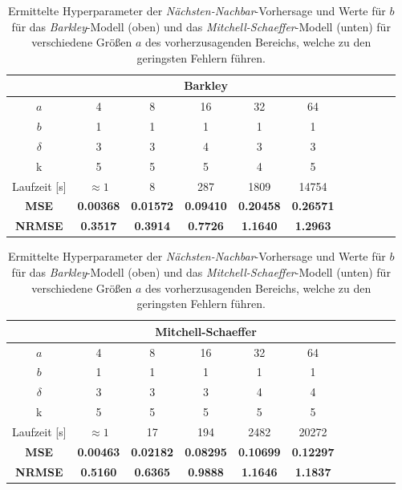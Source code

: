 \begin{table}[h]
	\centering

	\begin{tabular}{ccccccccccc}
		\hline		
		\multicolumn{1}{c}{} & \multicolumn{5}{c}{Barkley}\\ 
		\hline 
		\rule[-1ex]{0pt}{2.5ex} $a$ & 4 & 8 & 16 & 32 & 64\\ 
		\rule[-1ex]{0pt}{2.5ex} $b$ & 1 & 1 & 1  & 1  & 1 \\ 
		\rule[-1ex]{0pt}{2.5ex} $\delta$ & 3 & 3 & 4 & 3 & 3 \\ 
		\rule[-1ex]{0pt}{2.5ex} k & 5 & 5 & 5 & 4 & 5 \\ 
		\rule[-1ex]{0pt}{2.5ex} Laufzeit [s] & $\approx 1$ & 8 & 287 & 1809 & 14754\\ 
		\rule[-1ex]{0pt}{2.5ex} \textbf{MSE} & \textbf{0.00368} & \textbf{0.01572} & \textbf{0.09410} & \textbf{0.20458} & \textbf{0.26571}\\ 
		\rule[-1ex]{0pt}{2.5ex} \textbf{NRMSE} & \textbf{0.3517} & \textbf{0.3914} & \textbf{0.7726} & \textbf{1.1640} & \textbf{1.2963} \\ 
		\hline 
	\end{tabular} 
	
	\vspace{0.75cm}

	\centering

	\begin{tabular}{ccccccccccc}
		\hline
		\multicolumn{1}{c}{} & \multicolumn{5}{c}{Mitchell-Schaeffer} \\ 
		\hline 
		\rule[-1ex]{0pt}{2.5ex} $a$ & 4 & 8 & 16 & 32 & 64 \\ 
		\rule[-1ex]{0pt}{2.5ex} $b$ & 1 & 1 & 1  & 1  & 1\\ 
		\rule[-1ex]{0pt}{2.5ex} $\delta$ & 3 & 3 & 3 & 4 & 4 \\ 
		\rule[-1ex]{0pt}{2.5ex} k & 5 & 5 & 5 & 5 & 5 \\ 
		\rule[-1ex]{0pt}{2.5ex} Laufzeit [s] & $\approx 1$ & 17 & 194 & 2482 & 20272\\ 
		\rule[-1ex]{0pt}{2.5ex} \textbf{MSE} & \textbf{0.00463} & \textbf{0.02182} & \textbf{0.08295} & \textbf{0.10699} & \textbf{0.12297} \\ 
		\rule[-1ex]{0pt}{2.5ex} \textbf{NRMSE} & \textbf{0.5160} & \textbf{0.6365} & \textbf{0.9888} & \textbf{1.1646} & \textbf{1.1837} \\ 
		\hline 
	\end{tabular} 

	\caption{Ermittelte Hyperparameter der \textit{Nächsten-Nachbar}-Vorhersage und Werte für $b$ für das \textit{Barkley}-Modell (oben) und das \textit{Mitchell-Schaeffer}-Modell (unten) für verschiedene Größen $a$ des vorherzusagenden Bereichs, welche zu den geringsten Fehlern führen.}
\label{tab:exp_inner_cross_nn_results}
\end{table}

